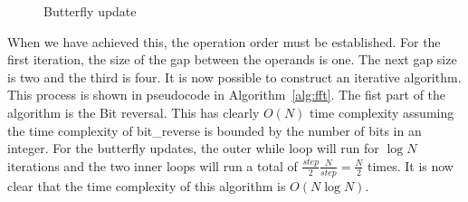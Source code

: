 \ifrelease
\begin{figure}
    \centering
    \caption{Butterfly update \cite{fft:derivation}}
    \label{fig:butterfly:update}
\end{figure}
\fi

When we have achieved this, the operation order must be established. For the first iteration, the size of the gap between the operands is one. The next gap size is two and the third is four. It is now possible to construct an iterative algorithm. This process is shown in pseudocode in Algorithm~\ref{alg:fft}. The fist part of the algorithm is the Bit reversal. This has clearly $O(N)$ time complexity assuming the time complexity of bit\_reverse is bounded by the number of bits in an integer. For the butterfly updates, the outer while loop will run for $\log{}N$ iterations and the two inner loops will run a total of $\frac{step}{2} \frac{N}{step} = \frac{N}{2}$ times. It is now clear that the time complexity of this algorithm is $O(N\log{}N)$.


